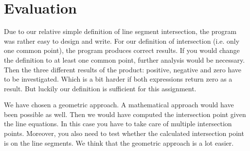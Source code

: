 \documentclass[a4paper,10pt]{article}
\begin{document}
\section{Evaluation}
Due to our relative simple definition of line segment intersection, the program was rather easy to design and write. For our definition of intersection (i.e. only one common point), the program produces correct results. If you would change the definition to 
at least one common point, further analysis would be necessary. Then the three different results of the product: positive, negative and zero have to be investigated. 
Which is a bit harder if both expressions return zero as a result. But luckily our definition is sufficient for this assignment.

We have chosen a geometric approach. A mathematical approach would have been possible as well. Then we would have computed the intersection point given the line equations. In this case you have to take care of multiple intersection points. Moreover, you also need to test whether the calculated intersection point is on the line segments. We think that the geometric approach is a lot easier.
\end{document}
